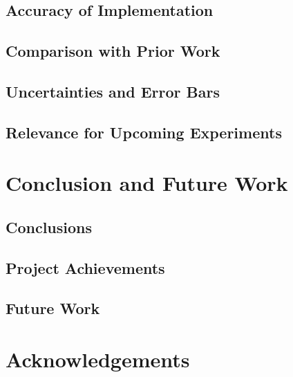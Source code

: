 \documentclass[floats,floatfix,showpacs,amssymb,prd,superscriptaddress,nofootinbib]{revtex4-2} %
\begin{document}
\subsection{Accuracy of Implementation}
\subsection{Comparison with Prior Work}
\subsection{Uncertainties and Error Bars}
\subsection{Relevance for Upcoming Experiments}

\newpage
\section{Conclusion and Future Work}
\subsection{Conclusions}
\subsection{Project Achievements}
\subsection{Future Work}

\section{Acknowledgements}




\newpage
\nocite{*}
\printbibliography[title={References}]
\end{document}
